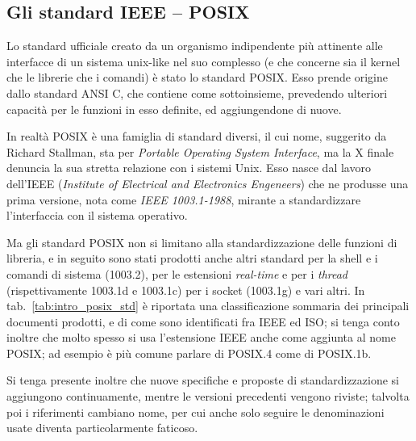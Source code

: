 \subsection{Gli standard IEEE -- POSIX}
\label{sec:intro_posix}

Lo standard ufficiale creato da un organismo indipendente più attinente alle
interfacce di un sistema unix-like nel suo complesso (e che concerne sia il
kernel che le librerie che i comandi) è stato lo standard POSIX. Esso prende
origine dallo standard ANSI C, che contiene come sottoinsieme, prevedendo
ulteriori capacità per le funzioni in esso definite, ed aggiungendone di
nuove.

In realtà POSIX è una famiglia di standard diversi, il cui nome, suggerito da
Richard Stallman, sta per \textit{Portable Operating System Interface}, ma la
X finale denuncia la sua stretta relazione con i sistemi Unix. Esso nasce dal
lavoro dell'IEEE (\textit{Institute of Electrical and Electronics Engeneers})
che ne produsse una prima versione, nota come \textsl{IEEE 1003.1-1988},
mirante a standardizzare l'interfaccia con il sistema operativo.

Ma gli standard POSIX non si limitano alla standardizzazione delle funzioni di
libreria, e in seguito sono stati prodotti anche altri standard per la shell e
i comandi di sistema (1003.2), per le estensioni \textit{real-time} e per i
\textit{thread} (rispettivamente 1003.1d e 1003.1c) per i socket (1003.1g) e
vari altri.  In tab.~\ref{tab:intro_posix_std} è riportata una classificazione
sommaria dei principali documenti prodotti, e di come sono identificati fra
IEEE ed ISO; si tenga conto inoltre che molto spesso si usa l'estensione IEEE
anche come aggiunta al nome POSIX; ad esempio è più comune parlare di POSIX.4
come di POSIX.1b.

Si tenga presente inoltre che nuove specifiche e proposte di standardizzazione
si aggiungono continuamente, mentre le versioni precedenti vengono riviste;
talvolta poi i riferimenti cambiano nome, per cui anche solo seguire le
denominazioni usate diventa particolarmente faticoso.

